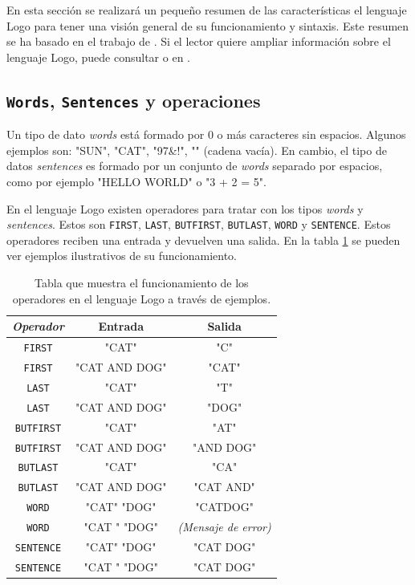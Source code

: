 En esta sección se realizará un pequeño resumen de las características el lenguaje Logo para tener una visión general de su funcionamiento y sintaxis. Este resumen se ha basado en el trabajo de \cite[p.274-305]{feurzeig1969programming}. Si el lector quiere ampliar información sobre el lenguaje Logo, puede consultar \cite{friendly2014advanced} o en \cite{logo-resources}.


\subsection*{\texttt{Words}, \texttt{Sentences} y operaciones}

Un tipo de dato \emph{words} está formado por 0 o más caracteres sin espacios. Algunos ejemplos son: "SUN", "CAT", "97&!", "" (cadena vacía). En cambio, el tipo de datos \emph{sentences} es formado por un conjunto de \emph{words} separado por espacios, como por ejemplo "HELLO WORLD" o "3 + 2 = 5". 

En el lenguaje Logo existen operadores para tratar con los tipos \emph{words} y \emph{sentences}. Estos son \texttt{FIRST}, \texttt{LAST}, \texttt{BUTFIRST}, \texttt{BUTLAST}, \texttt{WORD} y \texttt{SENTENCE}. Estos operadores reciben una entrada y devuelven una salida. En la tabla \ref{tab:logo-operadores} se pueden ver ejemplos ilustrativos de su funcionamiento.

\begin{table}[!ht]
	\begin{centering}
		\begin{tabular}{c|c|c}
\emph{Operador} & Entrada & Salida\\
\hline
\texttt{FIRST} & "CAT" & "C"\\
\texttt{FIRST} & "CAT AND DOG" & "CAT"\\
\texttt{LAST} & "CAT" & "T"\\
\texttt{LAST} & "CAT AND DOG" & "DOG"\\
\texttt{BUTFIRST} & "CAT" & "AT"\\
\texttt{BUTFIRST} & "CAT AND DOG" & "AND DOG"\\
\texttt{BUTLAST} & "CAT" & "CA"\\
\texttt{BUTLAST} & "CAT AND DOG" & "CAT AND"\\
\texttt{WORD} & "CAT" "DOG" & "CATDOG"\\
\texttt{WORD} & "CAT " "DOG" & \emph{(Mensaje de error)}\\
\texttt{SENTENCE} & "CAT" "DOG" & "CAT DOG"\\
\texttt{SENTENCE} & "CAT " "DOG" & "CAT DOG"\\
\end{tabular}
	\caption{Tabla que muestra el funcionamiento de los operadores en el lenguaje Logo a través de ejemplos.}
		\label{tab:logo-operadores}
	\end{centering}
\end{table}





